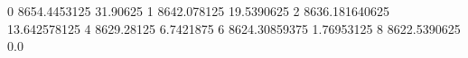 0 8654.4453125 31.90625
1 8642.078125 19.5390625
2 8636.181640625 13.642578125
4 8629.28125 6.7421875
6 8624.30859375 1.76953125
8 8622.5390625 0.0
